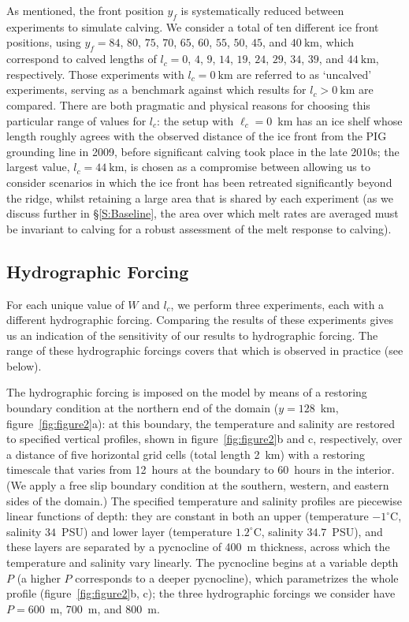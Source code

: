 \documentclass[draft]{agujournal2019}
\begin{document}
As mentioned, the front position $y_f$ is systematically reduced between experiments to simulate calving. We consider a total of ten different ice front positions, using $y_f=84$, $80$, $75$, $70$, $65$, $60$, $55$, $50$, $45$, and $40~\text{km}$, which correspond to calved lengths of $l_c=0$, $4$, $9$, $14$, $19$, $24$, $29$, $34$, $39$, and $44~\text{km}$, respectively. Those experiments with $l_c = 0~\text{km}$ are referred to as `uncalved' experiments, serving as a benchmark against which results for $l_c >0~\text{km}$ are compared. There are both pragmatic and physical reasons for choosing this particular range of values for $l_c$: the setup with $\ell_c = 0$~km has an ice shelf whose length roughly agrees with the observed distance of the ice front from the PIG grounding line in 2009, before significant calving took place in the late 2010s; the largest value, $l_c = 44~\text{km}$, is chosen as a compromise between allowing us to consider scenarios in which the ice front has been retreated significantly beyond the ridge, whilst retaining a large area that is shared by each experiment (as we discuss further in \S\ref{S:Baseline}, the area over which melt rates are averaged must be invariant to calving for a robust assessment of the melt response to calving).


\subsection{Hydrographic Forcing}\label{S:Experiment:Hydrography}
For each unique value of $W$ and $l_c$, we perform three experiments, each with a different hydrographic forcing. Comparing the results of these experiments gives us an indication of the sensitivity of our results to hydrographic forcing. The range of these hydrographic forcings covers that which is observed in practice (see below).

The hydrographic forcing is imposed on the model by means of a restoring boundary condition at the northern end of the domain ($y = 128$~km, figure~\ref{fig:figure2}a): at this boundary, the temperature and salinity are restored to specified vertical profiles, shown in figure~\ref{fig:figure2}b and c, respectively, over a distance of five horizontal grid cells (total length 2 km) with a restoring timescale that varies from 12~hours at the boundary to 60~hours in the interior. (We apply a free slip boundary condition at the southern, western, and eastern sides of the domain.) The specified temperature and salinity profiles are piecewise linear functions of depth: they are constant in both an upper (temperature $-1^\circ$C, salinity $34$~PSU) and lower layer (temperature $1.2^\circ$C, salinity $34.7$~PSU), and these layers are separated by a pycnocline of 400~m thickness, across which the temperature and salinity vary linearly. The pycnocline begins at a variable depth $P$ (a higher $P$ corresponds to a deeper pycnocline), which parametrizes the whole profile (figure~\ref{fig:figure2}b, c); the three hydrographic forcings we consider have $P=600$ m, 700 m, and 800 m.
\end{document}
